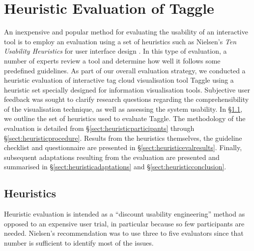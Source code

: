 \chapter{Heuristic Evaluation of Taggle}
\label{chap:heuristiceval}
\ifpdf
    \graphicspath{{Chapters/HeuristicEvaluation/HeuristicEvaluationFigs/PNG/}{Chapters/HeuristicEvaluation/HeuristicEvaluationFigs/PDF/}{Chapters/HeuristicEvaluation/HeuristicEvaluationFigs/}}
\else
    \graphicspath{{Chapters/HeuristicEvaluation/HeuristicEvaluationFigs/EPS/}{Chapters/HeuristicEvaluation/HeuristicEvaluationFigs/}}
\fi  

An inexpensive and popular method for evaluating the usability of an interactive tool is to employ an evaluation using a set of heuristics such as Nielsen's \textit{Ten Usability Heuristics} for user interface design \citep{nielsen92}. In this type of evaluation, a number of experts review a tool and determine how well it follows some predefined guidelines. As part of our overall evaluation strategy, we conducted a heuristic evaluation of interactive tag cloud visualisation tool Taggle using a heuristic set specially designed for information visualisation tools. Subjective user feedback was sought to clarify research questions regarding the comprehensibility of the visualisation technique, as well as assessing the system usability. In \S\ref{sect:heuristics}, we outline the set of heuristics used to evaluate Taggle. The methodology of the evaluation is detailed from \S\ref{sect:heuristicparticipants} through \S\ref{sect:heuristicprocedure}. Results from the heuristics themselves, the guideline checklist and questionnaire are presented in \S\ref{sect:heuristicevalresults}. Finally, subsequent adaptations resulting from the evaluation are presented and summarised in \S\ref{sect:heuristicadaptations} and \S\ref{sect:heuristicconclusion}.

\section{Heuristics}\label{sect:heuristics}

Heuristic evaluation is intended as a ``discount usability engineering'' method as opposed to an expensive user trial, in particular because so few participants are needed. Nielsen's recommendation was to use three to five evaluators since that number is sufficient to identify most of the issues.

